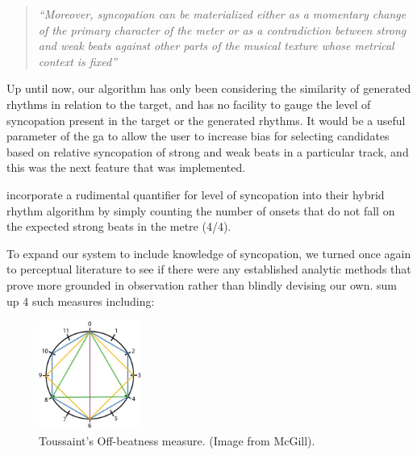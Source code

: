{{{\blockquote{\textit{``Moreover, syncopation can be materialized either as a momentary change of the primary character of the meter or as a contradiction between strong and weak beats against other parts of the musical texture whose metrical context is fixed''}}

Up until now, our algorithm has only been considering the similarity of generated rhythms in relation to the target, and has no facility to gauge the level of syncopation present in the target or the generated rhythms. It would be a useful parameter of the \acrshort{ga} to allow the user to increase bias for selecting candidates based on relative syncopation of strong and weak beats in a particular track, and this was the next feature that was implemented.

\cite{Eigenfeldt2013} incorporate a rudimental quantifier for level of syncopation into their hybrid rhythm algorithm by simply counting the number of onsets that do not fall on the expected strong beats in the metre (4/4).

To expand our system to include knowledge of syncopation, we turned once again to perceptual literature to see if there were any established analytic methods that prove more grounded in observation rather than blindly devising our own. \cite{Gomez2005} sum up 4 such measures including:

  \begin{figure}
	\begin{center}
		\includegraphics[width=0.3\textwidth]{ch03_symbolic/figures/offBeatness.jpg}
	\end{center}
	\caption[Toussaint's Off-beatness measure]{Toussaint's Off-beatness measure. (Image from McGill).}
	\label{fig:offbeatness}
	\end{figure}
	
}}}
